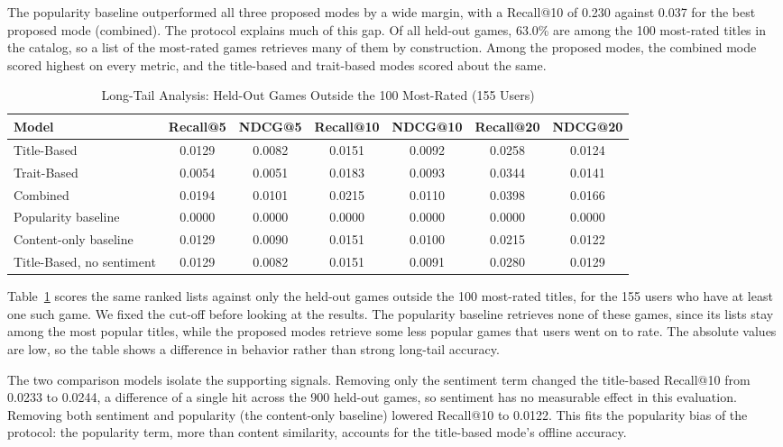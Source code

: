 \documentclass[conference]{IEEEtran}
\begin{document}
The popularity baseline outperformed all three proposed modes by a wide margin, with a Recall@10 of 0.230 against 0.037 for the best proposed mode (combined). The protocol explains much of this gap. Of all held-out games, 63.0\% are among the 100 most-rated titles in the catalog, so a list of the most-rated games retrieves many of them by construction. Among the proposed modes, the combined mode scored highest on every metric, and the title-based and trait-based modes scored about the same.

\begin{table}[h]
\centering
\caption{Long-Tail Analysis: Held-Out Games Outside the 100 Most-Rated (155 Users)}
\begin{adjustbox}{width=\columnwidth}
\begin{tabular}{lcccccc}
\toprule
Model & Recall@5 & NDCG@5 & Recall@10 & NDCG@10 & Recall@20 & NDCG@20 \\
\midrule
Title-Based & 0.0129 & 0.0082 & 0.0151 & 0.0092 & 0.0258 & 0.0124 \\
Trait-Based & 0.0054 & 0.0051 & 0.0183 & 0.0093 & 0.0344 & 0.0141 \\
Combined & 0.0194 & 0.0101 & 0.0215 & 0.0110 & 0.0398 & 0.0166 \\
\midrule
Popularity baseline & 0.0000 & 0.0000 & 0.0000 & 0.0000 & 0.0000 & 0.0000 \\
Content-only baseline & 0.0129 & 0.0090 & 0.0151 & 0.0100 & 0.0215 & 0.0122 \\
Title-Based, no sentiment & 0.0129 & 0.0082 & 0.0151 & 0.0091 & 0.0280 & 0.0129 \\
\bottomrule
\end{tabular}
\end{adjustbox}
\label{tab:longtail}
\end{table}

Table~\ref{tab:longtail} scores the same ranked lists against only the held-out games outside the 100 most-rated titles, for the 155 users who have at least one such game. We fixed the cut-off before looking at the results. The popularity baseline retrieves none of these games, since its lists stay among the most popular titles, while the proposed modes retrieve some less popular games that users went on to rate. The absolute values are low, so the table shows a difference in behavior rather than strong long-tail accuracy.

The two comparison models isolate the supporting signals. Removing only the sentiment term changed the title-based Recall@10 from 0.0233 to 0.0244, a difference of a single hit across the 900 held-out games, so sentiment has no measurable effect in this evaluation. Removing both sentiment and popularity (the content-only baseline) lowered Recall@10 to 0.0122. This fits the popularity bias of the protocol: the popularity term, more than content similarity, accounts for the title-based mode's offline accuracy.
\end{document}
